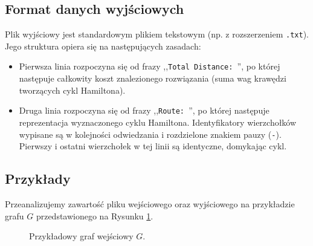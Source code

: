 \documentclass{article}
\theoremstyle{definition}
\theoremstyle{plain}
\theoremstyle{remark}
\begin{document}
\subsection{Format danych wyjściowych}

Plik wyjściowy jest standardowym plikiem tekstowym (np. z rozszerzeniem \texttt{.txt}). Jego struktura opiera się na następujących zasadach:

\begin{itemize}
    \item Pierwsza linia rozpoczyna się od frazy ,,\texttt{Total Distance:\ }'', po której następuje całkowity koszt znalezionego rozwiązania (suma wag krawędzi tworzących cykl Hamiltona).
    \item Druga linia rozpoczyna się od frazy ,,\texttt{Route:\ }'', po której następuje reprezentacja wyznaczonego cyklu Hamiltona. Identyfikatory wierzchołków wypisane są w kolejności odwiedzania i rozdzielone znakiem pauzy (\texttt{-}). Pierwszy i ostatni wierzchołek w tej linii są identyczne, domykając cykl.
\end{itemize}

\subsection{Przykłady}

Przeanalizujemy zawartość pliku wejściowego oraz wyjściowego na przykładzie grafu $G$ przedstawionego na Rysunku \ref{rys:przyklad}. 

\begin{figure}[H]
    \centering
    \caption{Przykładowy graf wejściowy $G$.}
    \label{rys:przyklad}
\end{figure}
\end{document}
